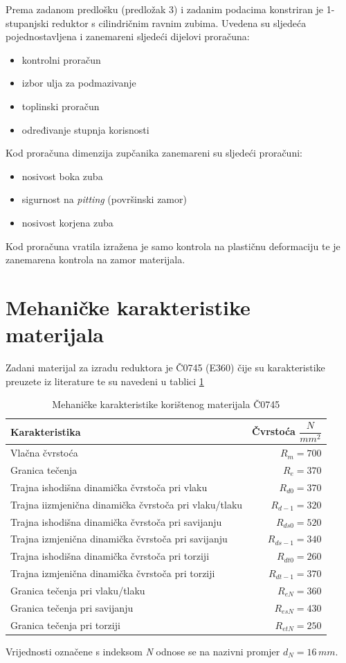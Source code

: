 \documentclass[11pt,a4paper]{report}
\begin{document}
Prema zadanom predlošku (predložak 3) i zadanim podacima konstriran je 1-stupanjski reduktor s cilindričnim ravnim zubima.
Uvedena su sljedeća pojednostavljena i zanemareni sljedeći dijelovi proračuna:
\begin{itemize}
\item kontrolni proračun
\item izbor ulja za podmazivanje
\item toplinski proračun
\item određivanje stupnja korisnosti
\end{itemize}
Kod proračuna dimenzija zupčanika zanemareni su sljedeći proračuni:
\begin{itemize}
\item nosivost boka zuba
\item sigurnost na \textit{pitting} (površinski zamor)
\item nosivost korjena zuba
\end{itemize}
Kod proračuna vratila izražena je samo kontrola na plastičnu deformaciju te je zanemarena kontrola na zamor materijala.

\section{Mehaničke karakteristike materijala}
Zadani materijal za izradu reduktora je Č0745 (E360) čije su karakteristike preuzete iz literature \cite{potrebniMaterijali} te su navedeni u tablici \ref{MehanickeKarakteristikeMaterijala}
\begin{table}
\begin{tabular}{|l|r|}\hline 
Karakteristika & Čvrstoća $\dfrac{N}{mm^2}$ \\ \hline 

Vlačna čvrstoća & $R_m=700 $ \\ \hline 
Granica tečenja & $R_e=370 $ \\ \hline 
Trajna ishodišna dinamička čvrstoča pri vlaku & $R_{d0}=370 $ \\ \hline 
Trajna iizmjenična dinamička čvrstoča pri vlaku/tlaku & $R_{d-1}=320 $ \\ \hline 
Trajna ishodišna dinamička čvrstoča pri savijanju & $R_{ds0}=520 $ \\ \hline 
Trajna izmjenična dinamička čvrstoča pri savijanju & $R_{ds-1}=340 $ \\ \hline 
Trajna ishodišna dinamička čvrstoča pri torziji & $R_{dt0}=260 $ \\ \hline 
Trajna izmjenična dinamička čvrstoča pri torziji & $R_{dt-1}=370 $ \\ \hline 
Granica tečenja pri vlaku/tlaku & $R_{eN}=360 $ \\ \hline 
Granica tečenja pri savijanju & $R_{esN}=430 $ \\ \hline 
Granica tečenja pri torziji & $R_{etN}=250 $ \\ \hline 
\end{tabular} 
Vrijednosti označene s indeksom \emph{N} odnose se na nazivni promjer $d_N=16\,mm$.

\caption{Mehaničke karakteristike korištenog materijala Č0745} \label{MehanickeKarakteristikeMaterijala}
\end{table}
\end{document}
